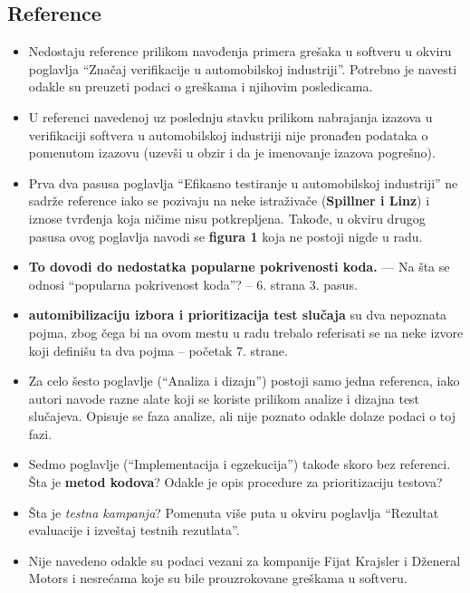 \documentclass[a4paper]{report}
\newcommand{\odgovor}[1]{\textcolor{blue}{#1}}
\begin{document}
\subsection{Reference}
\begin{itemize}
\item Nedostaju reference prilikom navođenja primera grešaka u softveru u okviru poglavlja ``Značaj verifikacije u automobilskoj industriji''. Potrebno je navesti odakle su preuzeti podaci o greškama i njihovim posledicama.
\item U referenci navedenoj uz poslednju stavku prilikom nabrajanja izazova u verifikaciji softvera u automobilskoj industriji nije pronađen podataka o pomenutom izazovu (uzevši u obzir i da je imenovanje izazova pogrešno).
\item Prva dva pasusa poglavlja ``Efikasno testiranje u automobilskoj industriji'' ne sadrže reference iako se pozivaju na neke istraživače ({\bf{Spillner i Linz}}) i iznose tvrđenja koja ničime nisu potkrepljena. Takođe, u okviru drugog pasusa ovog poglavlja navodi se {\bf{figura 1}} koja ne postoji nigde u radu.
\item {\bf{To dovodi do nedostatka popularne pokrivenosti koda.}} --- Na šta se odnosi ``popularna pokrivenost koda''? -- 6. strana 3. pasus. \odgovor{}
\item {\bf{automibilizaciju izbora i prioritizacija test slučaja}} su dva nepoznata pojma, zbog čega bi na ovom mestu u radu trebalo referisati se na neke izvore koji definišu ta dva pojma -- početak 7. strane.
\item Za celo šesto poglavlje (``Analiza i dizajn'') postoji samo jedna referenca, iako autori navode razne alate koji se koriste prilikom analize i dizajna test slučajeva. Opisuje se faza analize, ali nije poznato odakle dolaze podaci o toj fazi.
\item Sedmo poglavlje (``Implementacija i egzekucija'') takođe skoro bez referenci. Šta je {\bf{metod kodova}}? Odakle je opis procedure za prioritizaciju testova?
\item Šta je {\em{testna kampanja}}? Pomenuta više puta u okviru poglavlja ``Rezultat evaluacije i izveštaj testnih rezutlata''.
\item Nije navedeno odakle su podaci vezani za kompanije Fijat Krajsler i Dženeral Motors i nesrećama koje su bile prouzrokovane greškama u softveru.
\end{itemize}
\end{document}
